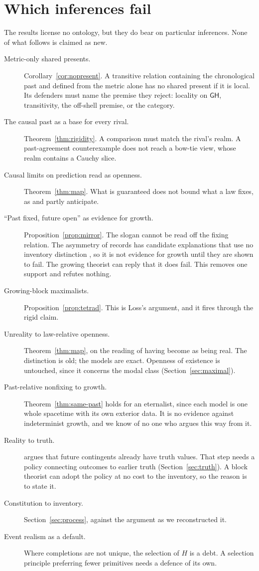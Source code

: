 \documentclass[11pt]{article}
\theoremstyle{definition}
\newcommand{\GH}{\mathsf{GH}}
\begin{document}
\section{Which inferences fail}\label{sec:revise}

The results license no ontology, but they do bear on particular inferences. None of what follows is claimed as new.

\begin{description}
\item[Metric-only shared presents.] Corollary~\ref{cor:nopresent}. A transitive relation containing the chronological past and defined from the metric alone has no shared present if it is local. Its defenders must name the premise they reject: locality on $\GH$, transitivity, the off-shell premise, or the category.
\item[The causal past as a base for every rival.] Theorem~\ref{thm:rigidity}. A comparison must match the rival's realm. A past-agreement counterexample does not reach a bow-tie view, whose realm contains a Cauchy slice.
\item[Causal limits on prediction read as openness.] Theorem~\ref{thm:map}. What is guaranteed does not bound what a law fixes, as \citet{Manchak2008} and \citet{Earman1995} partly anticipate.
\item[``Past fixed, future open'' as evidence for growth.] Proposition~\ref{prop:mirror}. The slogan cannot be read off the fixing relation. The asymmetry of records has candidate explanations that use no inventory distinction \citep{Albert2000,Ismael2012,Kutach2011}, so it is not evidence for growth until they are shown to fail. The growing theorist can reply that it does fail. This removes one support and refutes nothing.
\item[Growing-block maximalists.] Proposition~\ref{prop:tetrad}. This is Loss's argument, and it fires through the rigid claim.
\item[Unreality to law-relative openness.] Theorem~\ref{thm:map}, on the reading of having become as being real. The distinction is old; the models are exact. Openness of existence is untouched, since it concerns the modal class (Section~\ref{sec:maximal}).
\item[Past-relative nonfixing to growth.] Theorem~\ref{thm:same-past} holds for an eternalist, since each model is one whole spacetime with its own exterior data. It is no evidence against indeterminist growth, and we know of no one who argues this way from it.
\item[Reality to truth.] \citet[pp.~243--246]{Putnam1967} argues that future contingents already have truth values. That step needs a policy connecting outcomes to earlier truth (Section~\ref{sec:truth}). A block theorist can adopt the policy at no cost to the inventory, so the reason is to state it.
\item[Constitution to inventory.] Section~\ref{sec:process}, against the argument as we reconstructed it.
\item[Event realism as a default.] Where completions are not unique, the selection of $H$ is a debt. A selection principle preferring fewer primitives \citep{ProjectRole} needs a defence of its own.
\end{description}
\end{document}
